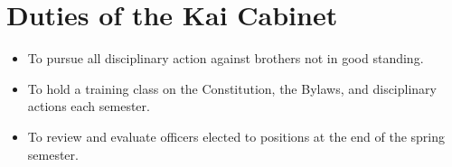 \chapter{Duties of the Kai Cabinet}
\label{app:duties-of-the-kai-cabinet}

\begin{itemize}

\item To pursue all disciplinary action against brothers not in good standing.
\item To hold a training class on the Constitution, the Bylaws, and
disciplinary actions each semester.
\item To review and evaluate officers elected to positions at the end of the
spring semester.
\end{itemize}
